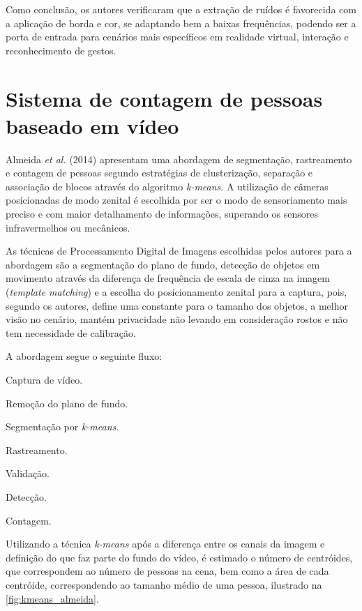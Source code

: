 \documentclass[12pt,oneside,a4paper,chapter=TITLE,section=TITLE,sumario=tradicional]{abntex2}
\begin{document}
Como conclusão, os autores verificaram que a extração de ruídos é favorecida com a aplicação de borda e cor, se adaptando bem a baixas frequências, podendo ser a porta de entrada para cenários mais específicos em realidade virtual, interação e reconhecimento de gestos.

\section{Sistema de contagem de pessoas baseado em vídeo}

Almeida \textit{et al.} (2014) apresentam uma abordagem de segmentação, rastreamento e contagem de pessoas segundo estratégias de clusterização, separação e associação de blocos através do algoritmo \textit{k-means}. A utilização de câmeras posicionadas de modo zenital é escolhida por ser o modo de sensoriamento mais preciso e com maior detalhamento de informações, superando os sensores infravermelhos ou mecânicos.

As técnicas de Processamento Digital de Imagens escolhidas pelos autores para a abordagem são a segmentação do plano de fundo, detecção de objetos em movimento através da diferença de frequência de escala de cinza na imagem (\textit{template matching}) e a escolha do posicionamento zenital para a captura, pois, segundo os autores, define uma constante para o tamanho dos objetos, a melhor visão no cenário, mantém privacidade não levando em consideração rostos e não tem necessidade de calibração.

A abordagem segue o seguinte fluxo:
\begin{lista}
    \item Captura de vídeo.
    \item Remoção do plano de fundo.
    \item Segmentação por \textit{k-means}.
    \item Rastreamento.
    \item Validação.
    \item Detecção.
    \item Contagem.
\end{lista}

Utilizando a técnica \textit{k-means} após a diferença entre os canais da imagem e definição do que faz parte do fundo do vídeo, é estimado o número de centróides, que correspondem ao número de pessoas na cena, bem como a área de cada centróide, correspondendo ao tamanho médio de uma pessoa, ilustrado na \autoref{fig:kmeans_almeida}.
\end{document}
